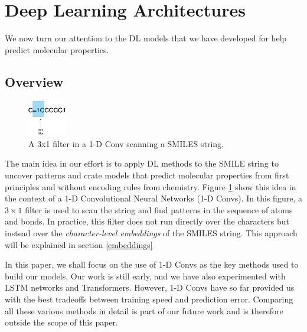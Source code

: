 \section{Deep Learning Architectures \label{archi}}
We now turn our attention to the DL models that we have developed for help predict molecular properties.
\subsection{Overview}
    \begin{figure}[htbp]
        \centering
        \includegraphics[width=0.15\textwidth]{figures/convonsmiles.png}
        \caption{A 3x1 filter in a 1-D Conv scanning a SMILES string. }
        \label{fig:conv-filter}
    \end{figure}
The main idea in our effort is to apply DL methods to the SMILE string to uncover patterns and crate models that predict molecular properties from first principles and without encoding rules from chemistry. Figure \ref{fig:conv-filter} show this idea in the context of a 1-D Convolutional Neural Networks (1-D Convs). In this figure, a $3 \times 1$ filter is used to scan the string and find patterns in the sequence of atoms and bonds. In practice, this filter does not run directly over the characters but instead  over the {\em character-level embeddings}  of the SMILES string. This approach will be explained in section \ref{embeddings}


In this paper, we shall focus on the use of 1-D Convs as the key methods used to build our models. Our work is still early, and we have also experimented with LSTM networks and Transformers. However,  1-D Convs have so far provided us with the best tradeoffs between training speed and prediction error. Comparing all these various methods in detail is part of our future work and is therefore outside the scope of this paper. 


